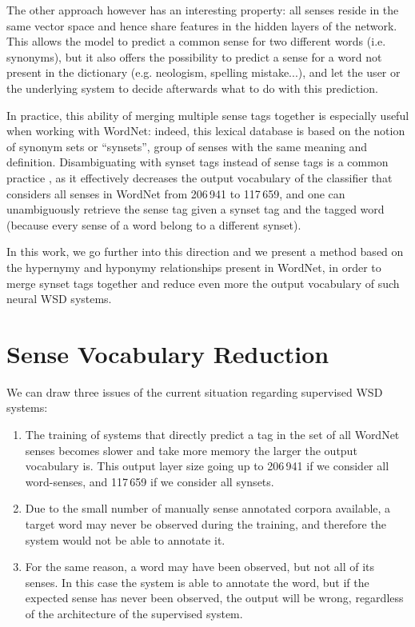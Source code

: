 \documentclass[11pt,a4paper]{article}
\begin{document}
The other approach however has an interesting property: all senses reside in the same vector space and hence share features in the hidden layers of the network. This allows the model to predict a common sense for two different words (i.e. synonyms), but it also offers the possibility to predict a sense for a word not present in the dictionary (e.g. neologism, spelling mistake...), and let the user or the underlying system to decide afterwards what to do with this prediction.


In practice, this ability of merging multiple sense tags together is especially useful when working with WordNet: indeed, this lexical database is based on the notion of synonym sets or ``synsets'', group of senses with the same meaning and definition. Disambiguating with synset tags instead of sense tags is a common practice \citep{yuan_2016,minh2018}, as it effectively decreases the output vocabulary of the classifier that considers all senses in WordNet from 206\,941 to 117\,659, and one can unambiguously retrieve the sense tag given a synset tag and the tagged word (because every sense of a word belong to a different synset).

In this work, we go further into this direction and we present a method based on the hypernymy and hyponymy relationships present in WordNet, in order to merge synset tags together and reduce even more the output vocabulary of such neural WSD systems.



\section{Sense Vocabulary Reduction} 


We can draw three issues of the current situation regarding supervised WSD systems:

\begin{enumerate}
    \item The training of systems that directly predict a tag in the set of all WordNet senses becomes slower and take more memory the larger the output vocabulary is. This output layer size going up to 206\,941 if we consider all word-senses, and 117\,659 if we consider all synsets.\item Due to the small number of manually sense annotated corpora available, a target word may never be observed during the training, and therefore the system would not be able to annotate it.\item For the same reason, a word may have been observed, but not all of its senses. In this case the system is able to annotate the word, but if the expected sense has never been observed, the output will be wrong, regardless of the architecture of the supervised system.
\end{enumerate}
\end{document}
